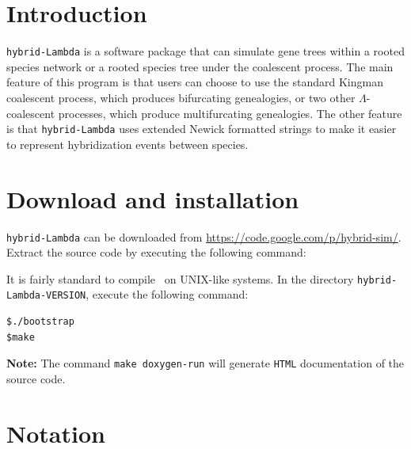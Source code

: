 

\section{Introduction}


{\tt hybrid-Lambda} is a software package that can simulate gene trees within a rooted species network or a rooted species tree under the coalescent process. The main feature of this program is that users can choose to use the standard Kingman coalescent process, which produces bifurcating genealogies, or two other $\Lambda$-coalescent processes, which produce multifurcating genealogies. The other feature is that {\tt hybrid-Lambda} uses extended Newick formatted strings to make it easier to represent hybridization events between species.

\vspace{1cm}

\begin{center}
%

\end{center}


\section{Download and installation}
{\tt hybrid-Lambda} can be downloaded from \url{https://code.google.com/p/hybrid-sim/}. Extract the source code by executing the following command:

It is fairly standard to compile \hs~on UNIX-like systems. In the directory {\tt hybrid-Lambda-VERSION}, execute the following command:
\begin{verbatim}
$./bootstrap
$make
\end{verbatim}

{\bf Note:} The command {\tt make doxygen-run} will generate {\tt HTML} documentation of the source code.

\section{Notation}
